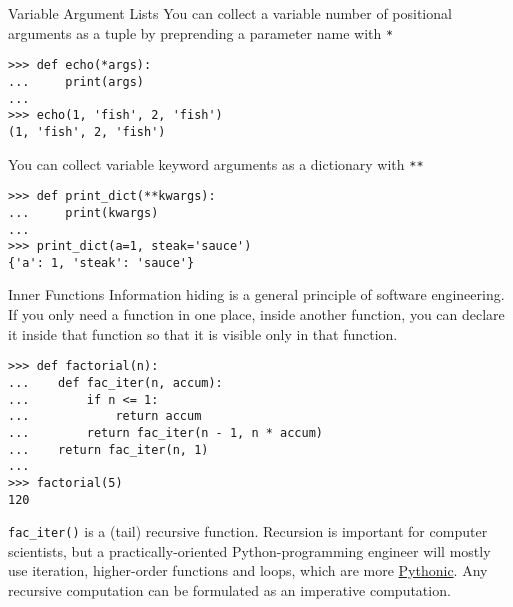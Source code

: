 \documentclass[smaller, aspectratio=1610]{beamer}
\begin{document}
\begin{frame}[label={sec:org9c87d1a},fragile]{Variable Argument Lists}
 You can collect a variable number of positional arguments as a tuple by preprending a parameter name with \texttt{*}

\lstset{language=Python,label= ,caption= ,captionpos=b,numbers=none}
\begin{lstlisting}
>>> def echo(*args):
...     print(args)
...
>>> echo(1, 'fish', 2, 'fish')
(1, 'fish', 2, 'fish')
\end{lstlisting}

You can collect variable keyword arguments as a dictionary with \texttt{**}

\lstset{language=Python,label= ,caption= ,captionpos=b,numbers=none}
\begin{lstlisting}
>>> def print_dict(**kwargs):
...     print(kwargs)
...
>>> print_dict(a=1, steak='sauce')
{'a': 1, 'steak': 'sauce'}
\end{lstlisting}
\end{frame}

\begin{frame}[label={sec:org90c072f},fragile]{Inner Functions}
 Information hiding is a general principle of software engineering. If you only need a function in one place, inside another function, you can declare it inside that function so that it is visible only in that function.

\lstset{language=Python,label= ,caption= ,captionpos=b,numbers=none}
\begin{lstlisting}
>>> def factorial(n):
...    def fac_iter(n, accum):
...        if n <= 1:
...            return accum
...        return fac_iter(n - 1, n * accum)
...    return fac_iter(n, 1)
...
>>> factorial(5)
120
\end{lstlisting}

\texttt{fac\_iter()} is a (tail) recursive function. Recursion is important for computer scientists, but a practically-oriented Python-programming engineer will mostly use iteration, higher-order functions and loops, which are more \href{http://neopythonic.blogspot.com/2009/04/tail-recursion-elimination.html}{Pythonic}. Any recursive computation can be formulated as an imperative computation.
\end{frame}
\end{document}
